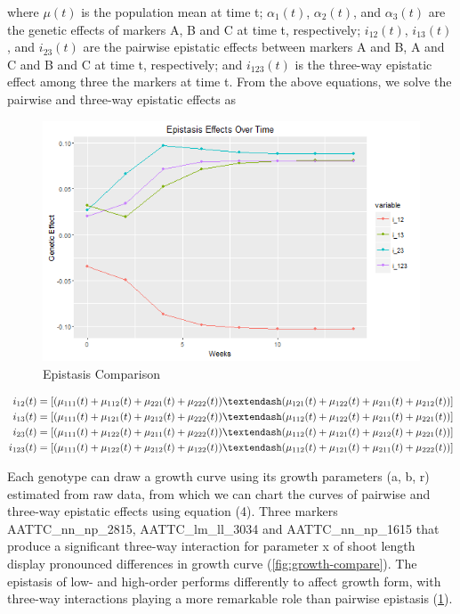\documentclass[11pt,]{book}
\theoremstyle{definition}
\theoremstyle{definition}
\theoremstyle{remark}
\begin{document}
where \(\mu(t)\) is the population mean at time t; \(\alpha_1(t)\),
\(\alpha_2(t)\), and \(\alpha_3(t)\) are the genetic effects of markers
A, B and C at time t, respectively; \(i_{12}(t)\), \(i_{13}(t)\), and
\(i_{23}(t)\) are the pairwise epistatic effects between markers A and
B, A and C and B and C at time t, respectively; and \(i_{123}(t)\) is
the three-way epistatic effect among three the markers at time t. From
the above equations, we solve the pairwise and three-way epistatic
effects as

\begin{figure}

{\centering \includegraphics[width=0.8\linewidth]{images/EpistasisComparison} 

}

\caption{Epistasis Comparison}\label{fig:epistasis-compare}
\end{figure}

\begin{align}
i_{12}(t) &=  [(\mu_{111}(t) + \mu_{112}(t) + \mu_{221}(t) + \mu_{222}(t)) – (\mu_{121}(t) + \mu_{122}(t) + \mu_{211}(t) + \mu_{212}(t))] \notag \\
i_{13}(t) &=  [(\mu_{111}(t) + \mu_{121}(t) + \mu_{212}(t) + \mu_{222}(t)) – (\mu_{112}(t) + \mu_{122}(t) + \mu_{211}(t) + \mu_{221}(t))] \notag \\
i_{23}(t) &=  [(\mu_{111}(t) + \mu_{122}(t) + \mu_{211}(t) + \mu_{222}(t)) – (\mu_{112}(t) + \mu_{121}(t) + \mu_{212}(t) + \mu_{221}(t))] \notag \\
i_{123}(t) &=  [(\mu_{111}(t) + \mu_{122}(t) + \mu_{212}(t) + \mu_{122}(t)) – (\mu_{112}(t) + \mu_{121}(t) + \mu_{211}(t) + \mu_{222}(t))]
\label{eq:epi-effects}
\end{align}

Each genotype can draw a growth curve using its growth parameters (a, b,
r) estimated from raw data, from which we can chart the curves of
pairwise and three-way epistatic effects using equation (4). Three
markers AATTC\_nn\_np\_2815, AATTC\_lm\_ll\_3034 and AATTC\_nn\_np\_1615
that produce a significant three-way interaction for parameter x of
shoot length display pronounced differences in growth curve
(\ref{fig:growth-compare}). The epistasis of low- and high-order
performs differently to affect growth form, with three-way interactions
playing a more remarkable role than pairwise epistasis
(\ref{fig:epistasis-compare}).
\end{document}
